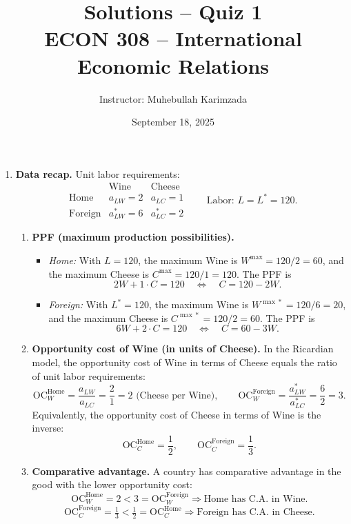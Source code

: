 \documentclass[12pt]{article}
\title{Solutions -- Quiz 1\\ \vspace{8pt} \Large ECON 308 -- International Economic Relations}
\author{Instructor: Muhebullah Karimzada}
\date{September 18, 2025}
\begin{document}
\maketitle


\begin{enumerate}



\item \textbf{Data recap.} Unit labor requirements:
\[
\begin{array}{c|cc}
 & \text{Wine} & \text{Cheese}\\\hline
\text{Home} & a_{LW}=2 & a_{LC}=1\\
\text{Foreign} & a_{LW}^{*}=6 & a_{LC}^{*}=2
\end{array}
\qquad \text{Labor: }L=L^{*}=120.
\]

\begin{enumerate}[label=(\alph*)]
\item \textbf{PPF (maximum production possibilities).}
\begin{itemize}
  \item \emph{Home:} With $L=120$, the maximum Wine is $W^{\max}=120/2=60$, and the maximum Cheese is $C^{\max}=120/1=120.$ The PPF is
  \[
  2W + 1\cdot C = 120 \quad \Longleftrightarrow \quad C = 120 - 2W.
  \]
  \item \emph{Foreign:} With $L^{*}=120$, the maximum Wine is $W^{\max*}=120/6=20$, and the maximum Cheese is $C^{\max*}=120/2=60.$ The PPF is
  \[
  6W + 2\cdot C = 120 \quad \Longleftrightarrow \quad C = 60 - 3W.
  \]
\end{itemize}

\item \textbf{Opportunity cost of Wine (in units of Cheese).}
In the Ricardian model, the opportunity cost of Wine in terms of Cheese equals the ratio of unit labor requirements:
\[
\text{OC}_W^{\text{Home}} = \frac{a_{LW}}{a_{LC}} = \frac{2}{1} = 2 \text{ (Cheese per Wine)},\qquad
\text{OC}_W^{\text{Foreign}} = \frac{a_{LW}^*}{a_{LC}^*} = \frac{6}{2} = 3.
\]
Equivalently, the opportunity cost of Cheese in terms of Wine is the inverse:
\[
\text{OC}_C^{\text{Home}} = \frac{1}{2},\qquad \text{OC}_C^{\text{Foreign}} = \frac{1}{3}.
\]

\item \textbf{Comparative advantage.}
A country has comparative advantage in the good with the lower opportunity cost:
\[
\text{OC}_W^{\text{Home}}=2 < 3=\text{OC}_W^{\text{Foreign}} \Rightarrow \text{Home has C.A. in Wine.}
\]
\[
\text{OC}_C^{\text{Foreign}}=\tfrac{1}{3} < \tfrac{1}{2}=\text{OC}_C^{\text{Home}} \Rightarrow \text{Foreign has C.A. in Cheese.}
\]


\end{enumerate}
\end{enumerate}
\end{document}
